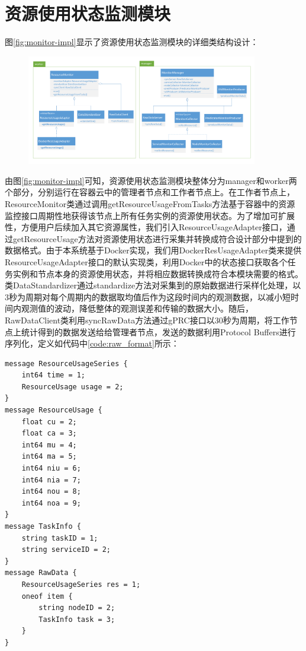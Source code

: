 \section{资源使用状态监测模块}
图\ref{fig:monitor-impl}显示了资源使用状态监测模块的详细类结构设计：
\begin{figure}[htbp]
\centering
\includegraphics[width=0.9\textwidth]{./figure/monitor_impl}
\end{figure}
由图\ref{fig:monitor-impl}可知，资源使用状态监测模块整体分为manager和worker两个部分，分别运行在容器云中的管理者节点和工作者节点上。在工作者节点上，ResourceMonitor类通过调用getResourceUsageFromTasks方法基于容器中的资源监控接口周期性地获得该节点上所有任务实例的资源使用状态。为了增加可扩展性，方便用户后续加入其它资源属性，我们引入ResourceUsageAdapter接口，通过getResourceUsage方法对资源使用状态进行采集并转换成符合设计部分中提到的数据格式。由于本系统基于Docker实现，我们用DockerResUsageAdapter类来提供ResourceUsageAdapter接口的默认实现类，利用Docker中的状态接口获取各个任务实例和节点本身的资源使用状态，并将相应数据转换成符合本模块需要的格式。类DataStandardizer通过standardize方法对采集到的原始数据进行采样化处理，以3秒为周期对每个周期内的数据取均值后作为这段时间内的观测数据，以减小短时间内观测值的波动，降低整体的观测误差和传输的数据大小。随后，RawDataClient类利用syncRawData方法通过gPRC接口以30秒为周期，将工作节点上统计得到的数据发送给给管理者节点，发送的数据利用Protocol Buffers进行序列化，定义如代码中\ref{code:raw_format}所示：
\begin{lstlisting}[language=protobuf3,style=protobuf, caption={资源使用状态监测数据},label={code:raw_format}]
message ResourceUsageSeries {
    int64 time = 1;
    ResourceUsage usage = 2;
}
message ResourceUsage {
    float cu = 2;
    float ca = 3;
    int64 mu = 4;
    int64 ma = 5;
    int64 niu = 6;
    int64 nia = 7;
    int64 nou = 8;
    int64 noa = 9;
}
message TaskInfo {
    string taskID = 1;
    string serviceID = 2;
}
message RawData {
    ResourceUsageSeries res = 1;
    oneof item {
        string nodeID = 2;
        TaskInfo task = 3;
    }
}
\end{lstlisting}

